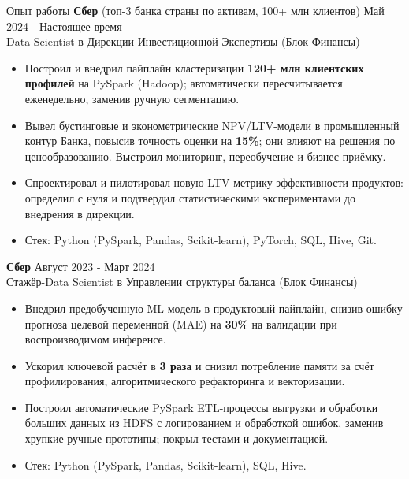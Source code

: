 \documentclass{resume} %
\begin{document}
	\begin{rSection}{Опыт работы}
		\textbf{Сбер} (топ-3 банка страны по активам, 100+ млн клиентов) \hfill {Май 2024 - Настоящее время}\\
		Data Scientist в Дирекции Инвестиционной Экспертизы (Блок Финансы) \\
		\vspace{-1.25em}
		\begin{itemize}
			\itemsep -3pt {}
			\item Построил и внедрил пайплайн кластеризации \textbf{120+ млн клиентских профилей} на PySpark (Hadoop); автоматически пересчитывается еженедельно, заменив ручную сегментацию.
			\item Вывел бустинговые и эконометрические NPV/LTV-модели в промышленный контур Банка, повысив точность оценки на \textbf{15\%}; они влияют на решения по ценообразованию. Выстроил мониторинг, переобучение и бизнес-приёмку.
			\item Спроектировал и пилотировал новую LTV-метрику эффективности продуктов: определил с нуля и подтвердил статистическими экспериментами до внедрения в дирекции.
			\item Стек: Python (PySpark, Pandas, Scikit-learn), PyTorch, SQL, Hive, Git.
		\end{itemize}
			
		\textbf{Сбер} \hfill {Август 2023 - Март 2024}\\
		Стажёр-Data Scientist в Управлении структуры баланса (Блок Финансы) \\
		\vspace{-1.25em}
		\begin{itemize}
			\itemsep -3pt {}
			\item Внедрил предобученную ML-модель в продуктовый пайплайн, снизив ошибку прогноза целевой переменной (MAE) на \textbf{30\%} на валидации при воспроизводимом инференсе.
			\item Ускорил ключевой расчёт в \textbf{3 раза} и снизил потребление памяти за счёт профилирования, алгоритмического рефакторинга и векторизации.
			\item Построил автоматические PySpark ETL-процессы выгрузки и обработки больших данных из HDFS с логированием и обработкой ошибок, заменив хрупкие ручные прототипы; покрыл тестами и документацией.
			\item Стек: Python (PySpark, Pandas, Scikit-learn), SQL, Hive.
		\end{itemize}
	\end{rSection}
\end{document}
